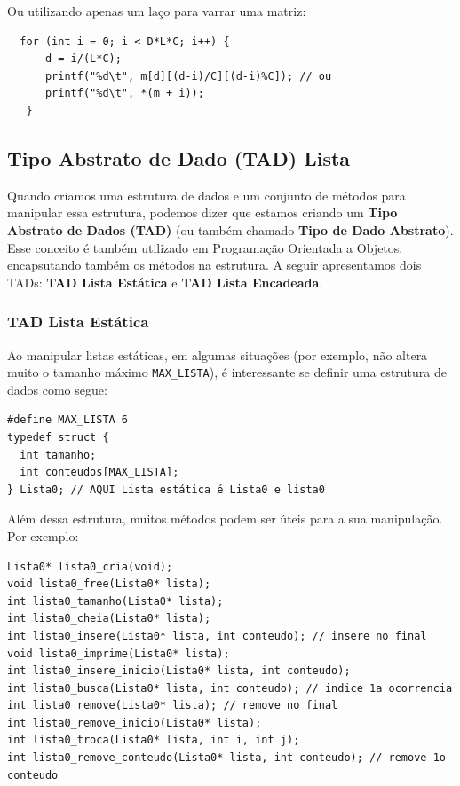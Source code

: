 \documentclass[12pt,a4paper]{article}
\begin{document}
Ou utilizando apenas um laço para varrar uma matriz:

\begin{verbatim}
  for (int i = 0; i < D*L*C; i++) {
      d = i/(L*C);
      printf("%d\t", m[d][(d-i)/C][(d-i)%C]); // ou
      printf("%d\t", *(m + i));
   }
\end{verbatim}

    \hypertarget{tipo-abstrato-de-dado-tad-lista}{%
\subsection{Tipo Abstrato de Dado (TAD)
Lista}\label{tipo-abstrato-de-dado-tad-lista}}

    Quando criamos uma estrutura de dados e um conjunto de métodos para
manipular essa estrutura, podemos dizer que estamos criando um
\textbf{Tipo Abstrato de Dados (TAD)} (ou também chamado \textbf{Tipo de
Dado Abstrato}). Esse conceito é também utilizado em Programação
Orientada a Objetos, encapsutando também os métodos na estrutura. A
seguir apresentamos dois TADs: \textbf{TAD Lista Estática} e \textbf{TAD
Lista Encadeada}.

    \hypertarget{tad-lista-estuxe1tica}{%
\subsubsection{TAD Lista Estática}\label{tad-lista-estuxe1tica}}

    Ao manipular listas estáticas, em algumas situações (por exemplo, não
altera muito o tamanho máximo \texttt{MAX\_LISTA}), é interessante se
definir uma estrutura de dados como segue:

\begin{verbatim}
#define MAX_LISTA 6
typedef struct {
  int tamanho;
  int conteudos[MAX_LISTA];
} Lista0; // AQUI Lista estática é Lista0 e lista0
\end{verbatim}

Além dessa estrutura, muitos métodos podem ser úteis para a sua
manipulação. Por exemplo:

\begin{verbatim}
Lista0* lista0_cria(void);
void lista0_free(Lista0* lista);
int lista0_tamanho(Lista0* lista);
int lista0_cheia(Lista0* lista);
int lista0_insere(Lista0* lista, int conteudo); // insere no final
void lista0_imprime(Lista0* lista);
int lista0_insere_inicio(Lista0* lista, int conteudo);
int lista0_busca(Lista0* lista, int conteudo); // indice 1a ocorrencia
int lista0_remove(Lista0* lista); // remove no final
int lista0_remove_inicio(Lista0* lista);
int lista0_troca(Lista0* lista, int i, int j);
int lista0_remove_conteudo(Lista0* lista, int conteudo); // remove 1o conteudo
\end{verbatim}
\end{document}
